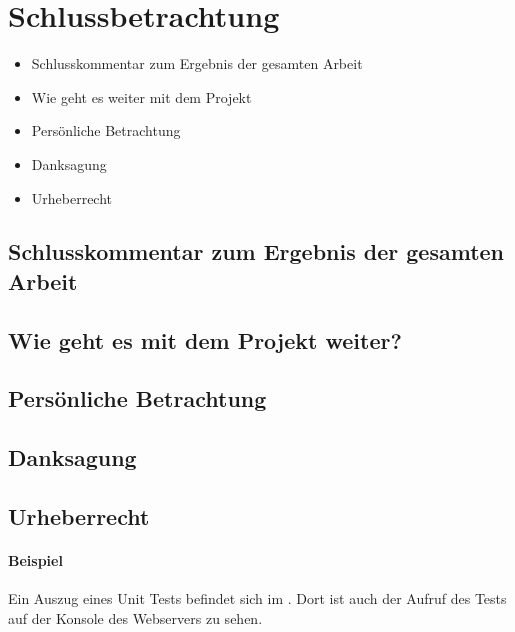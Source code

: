 \section{Schlussbetrachtung} 
\label{sec:Schlussbetrachtung}

\begin{itemize}
	\item Schlusskommentar zum Ergebnis der gesamten Arbeit
	\item Wie geht es weiter mit dem Projekt
	\item Persönliche Betrachtung
	\item Danksagung
	\item Urheberrecht
\end{itemize}

\subsection{Schlusskommentar zum Ergebnis der gesamten Arbeit}

\subsection{Wie geht es mit dem Projekt weiter?}

\subsection{Persönliche Betrachtung}

\subsection{Danksagung}

\subsection{Urheberrecht}


\paragraph{Beispiel}
Ein Auszug eines Unit Tests befindet sich im . Dort ist auch der Aufruf des Tests auf der Konsole des Webservers zu sehen.



